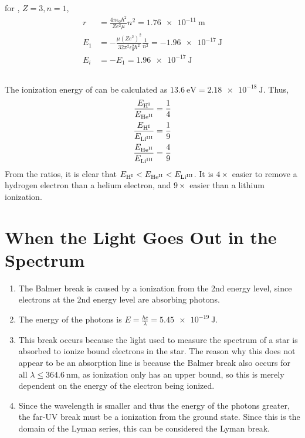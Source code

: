 \documentclass{article}
\begin{document}
\subsection{}

for , \(Z = 3, n = 1\),
\begin{align}
    r &= \frac{4 \pi \epsilon_0 \hbar^2}{Z e^2 \mu} n^2 = \SI{1.76e-11}{\meter} \\
    E_1 &= -\frac{\mu (Z e^2)^2}{32 \pi^2 \epsilon_0^2 \hbar^2} \frac{1}{n^2} = \SI{-1.96e-17}{\joule} \\
    E_i &= -E_1 = \SI{1.96e-17}{\joule}
\end{align}

\subsection{}

The ionization energy of  can be calculated as \(\SI{13.6}{\electronvolt} = \SI{2.18e-18}{\joule}\).
Thus,
\begin{align}
    \frac{E_{\ce{H^I}}}{E_{\ce{He^{II}}}} &= \frac{1}{4} \\
    \frac{E_{\ce{H^I}}}{E_{\ce{Li^{III}}}} &= \frac{1}{9} \\
    \frac{E_{\ce{He^{II}}}}{E_{\ce{Li^{III}}}} &= \frac{4}{9}
\end{align}
From the ratios, it is clear that \(E_{\ce{H^I}} < E_{\ce{He^{II}}} < E_{\ce{Li^{III}}}\).
It is \(4 \times\) easier to remove a hydrogen electron than a helium electron, and \(9 \times\) easier than a lithium ionization.

\section{When the Light Goes Out in the Spectrum}

\begin{enumerate}
    \item The Balmer break is caused by a ionization from the 2nd energy level, since electrons at the 2nd energy level are absorbing photons.
    \item The energy of the photons is \(E = \frac{h c}{\lambda} = \SI{5.45e-19}{\joule}\).
    \item This break occurs because the light used to measure the spectrum of a star is absorbed to ionize bound electrons in the star.
    The reason why this does not appear to be an absorption line is because the Balmer break also occurs for all \(\lambda \leqslant \SI{364.6}{\nano\meter}\), as ionization only has an upper bound, so this is merely dependent on the energy of the electron being ionized.
    \item Since the wavelength is smaller and thus the energy of the photons greater, the far-UV break must be a ionization from the ground state.
    Since this is the domain of the Lyman series, this can be considered the Lyman break.
\end{enumerate}
\end{document}
